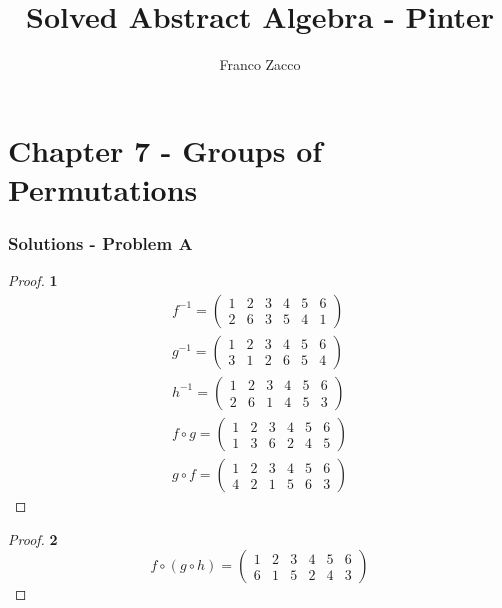 \documentclass[11pt]{article}
\title{\textbf{Solved Abstract Algebra - Pinter}}
\author{Franco Zacco}
\date{}
\begin{document}
\maketitle
\thispagestyle{empty}

\section*{Chapter 7 - Groups of Permutations}

	\subsubsection*{Solutions - Problem A}
		\begin{proof}{\textbf{1}} 
			\begin{gather*}
				f^{-1} =
				\begin{pmatrix}
					1 & 2 & 3 & 4 & 5 & 6 \\
					2 & 6 & 3 & 5 & 4 & 1
				\end{pmatrix}\\							
				g^{-1} =
				\begin{pmatrix}
					1 & 2 & 3 & 4 & 5 & 6 \\
					3 & 1 & 2 & 6 & 5 & 4
				\end{pmatrix}\\
				h^{-1} =
				\begin{pmatrix}
					1 & 2 & 3 & 4 & 5 & 6 \\
					2 & 6 & 1 & 4 & 5 & 3
				\end{pmatrix}\\
				f \circ g =
				\begin{pmatrix}
					1 & 2 & 3 & 4 & 5 & 6 \\
					1 & 3 & 6 & 2 & 4 & 5
				\end{pmatrix}\\
				g \circ f =
				\begin{pmatrix}
					1 & 2 & 3 & 4 & 5 & 6 \\
					4 & 2 & 1 & 5 & 6 & 3
				\end{pmatrix}
			\end{gather*}
		\end{proof}
		\begin{proof}{\textbf{2}}
			\begin{equation*}
				f \circ(g \circ h) =
				\begin{pmatrix}
					1 & 2 & 3 & 4 & 5 & 6 \\
					6 & 1 & 5 & 2 & 4 & 3
				\end{pmatrix}			
			\end{equation*}
		\end{proof}
\end{document}
